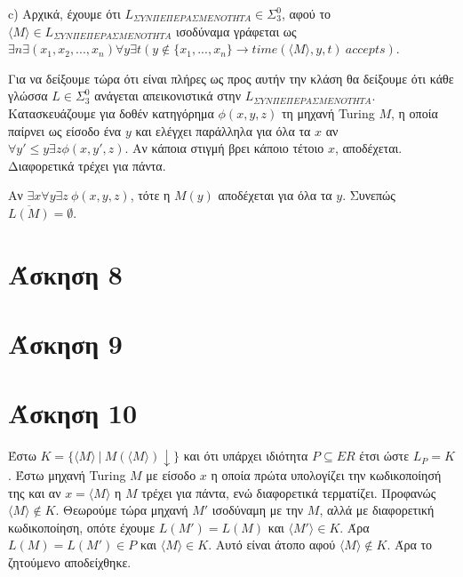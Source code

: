 \documentclass[a4paper, oneside, 11pt]{article}
\theoremstyle{definition}
\begin{document}
c) Αρχικά, έχουμε ότι $L_{\Sigma YN\Pi E\Pi EPA\Sigma MENOTHTA}\in \Sigma_3^0$, αφού το $\langle M\rangle \in L_{\Sigma YN\Pi E\Pi EPA\Sigma MENOTHTA}$ ισοδύναμα γράφεται
ως $\exists n \exists (x_1, x_2, ..., x_n)\forall y\exists t (y\notin \{x_1, ..., x_n\} \rightarrow time(\langle M\rangle, y, t)\ accepts)$.

Για να δείξουμε τώρα ότι είναι πλήρες ως προς αυτήν την κλάση θα δείξουμε ότι κάθε γλώσσα $L\in \Sigma_3^0$ ανάγεται απεικονιστικά στην $L_{\Sigma YN\Pi E\Pi EPA\Sigma MENOTHTA}$.
Κατασκευάζουμε για δοθέν κατηγόρημα $\phi(x,y,z)$ τη μηχανή Turing $M$, η οποία παίρνει ως είσοδο ένα $y$ και ελέγχει παράλληλα για όλα τα $x$ αν 
$\forall y'\leq y\exists z\phi(x,y',z)$.
Αν κάποια στιγμή βρει κάποιο τέτοιο $x$, αποδέχεται. Διαφορετικά τρέχει για πάντα.

Αν $\exists x\forall y\exists z\ \phi(x,y,z)$, τότε η $M(y)$ αποδέχεται για όλα τα $y$. Συνεπώς $\overline{L(M)}=\emptyset$.


\section*{Άσκηση 8}
\section*{Άσκηση 9}
\section*{Άσκηση 10}
Έστω $K=\{\langle M\rangle\ |\ M(\langle M\rangle)\downarrow \}$ και ότι υπάρχει ιδιότητα $P\subseteq ER$ έτσι ώστε $L_P = K$. Έστω μηχανή Turing $Μ$ με είσοδο $x$
η οποία πρώτα υπολογίζει την κωδικοποίησή της και αν $x=\langle M\rangle$ η $M$ τρέχει για πάντα, ενώ διαφορετικά τερματίζει. Προφανώς $\langle M\rangle\notin K$.
Θεωρούμε τώρα μηχανή $M'$ ισοδύναμη με την $M$, αλλά με διαφορετική κωδικοποίηση, οπότε έχουμε $L(M')=L(M)$ και $\langle M'\rangle \in K$. 
Άρα $L(M)=L(M')\in P$ και $\langle M\rangle \in K$. 
Αυτό είναι
άτοπο αφού $\langle M\rangle\notin K$. Άρα το ζητούμενο αποδείχθηκε.
\end{document}
